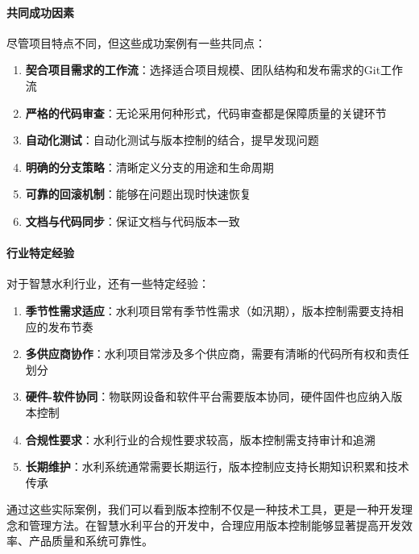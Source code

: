 \paragraph{共同成功因素}\label{ux5171ux540cux6210ux529fux56e0ux7d20}

尽管项目特点不同，但这些成功案例有一些共同点：

\begin{enumerate}
\def\labelenumi{\arabic{enumi}.}
\tightlist
\item
  \textbf{契合项目需求的工作流}：选择适合项目规模、团队结构和发布需求的Git工作流
\item
  \textbf{严格的代码审查}：无论采用何种形式，代码审查都是保障质量的关键环节
\item
  \textbf{自动化测试}：自动化测试与版本控制的结合，提早发现问题
\item
  \textbf{明确的分支策略}：清晰定义分支的用途和生命周期
\item
  \textbf{可靠的回滚机制}：能够在问题出现时快速恢复
\item
  \textbf{文档与代码同步}：保证文档与代码版本一致
\end{enumerate}

\paragraph{行业特定经验}\label{ux884cux4e1aux7279ux5b9aux7ecfux9a8c}

对于智慧水利行业，还有一些特定经验：

\begin{enumerate}
\def\labelenumi{\arabic{enumi}.}
\tightlist
\item
  \textbf{季节性需求适应}：水利项目常有季节性需求（如汛期），版本控制需要支持相应的发布节奏
\item
  \textbf{多供应商协作}：水利项目常涉及多个供应商，需要有清晰的代码所有权和责任划分
\item
  \textbf{硬件-软件协同}：物联网设备和软件平台需要版本协同，硬件固件也应纳入版本控制
\item
  \textbf{合规性要求}：水利行业的合规性要求较高，版本控制需支持审计和追溯
\item
  \textbf{长期维护}：水利系统通常需要长期运行，版本控制应支持长期知识积累和技术传承
\end{enumerate}

通过这些实际案例，我们可以看到版本控制不仅是一种技术工具，更是一种开发理念和管理方法。在智慧水利平台的开发中，合理应用版本控制能够显著提高开发效率、产品质量和系统可靠性。

